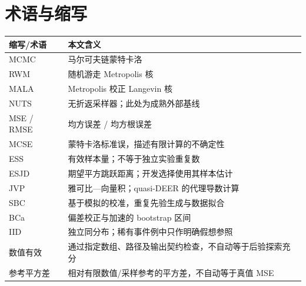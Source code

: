 \section*{术语与缩写}
\noindent\begin{tabularx}{\linewidth}{P{34mm}Y}\toprule
缩写/术语 & 本文含义\\\midrule
MCMC & 马尔可夫链蒙特卡洛\\
RWM & 随机游走 Metropolis 核\\
MALA & Metropolis 校正 Langevin 核\\
NUTS & 无折返采样器；此处为成熟外部基线\\
MSE / RMSE & 均方误差 / 均方根误差\\
MCSE & 蒙特卡洛标准误，描述有限计算的不确定性\\
ESS & 有效样本量；不等于独立实验重复数\\
ESJD & 期望平方跳跃距离；开发选择使用其样本估计\\
JVP & 雅可比—向量积；quasi-DEER 的代理导数计算\\
SBC & 基于模拟的校准，重复先验生成与数据拟合\\
BCa & 偏差校正与加速的 bootstrap 区间\\
IID & 独立同分布；稀有事件例中只作明确假想参照\\
数值有效 & 通过指定数组、路径及输出契约检查，不自动等于后验探索充分\\
参考平方差 & 相对有限数值/采样参考的平方差，不自动等于真值 MSE\\\bottomrule
\end{tabularx}
\clearpage
